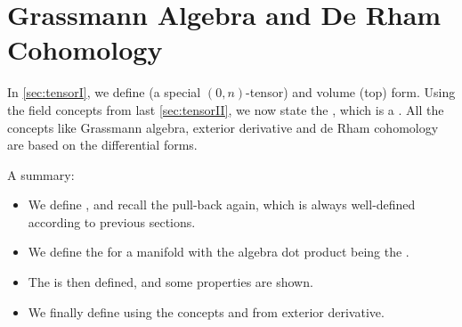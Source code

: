 \documentclass{article}
\begin{document}
\begin{enumerate}
\end{enumerate}

\section{Grassmann Algebra and De Rham Cohomology}\label{sec:grass}
In \cref{sec:tensorI}, we define  (a special $(0, n)$-tensor) and volume (top) form. Using the field concepts from last \cref{sec:tensorII}, we now state the , which is a  . All the concepts like Grassmann algebra, exterior derivative and de Rham cohomology are based on the differential forms.

A summary:
\begin{itemize}[$\blacktriangleright$]
\item We define , and recall the pull-back again, which is always well-defined according to previous sections.
\item We define the  for a manifold with the algebra dot product being the .
\item The  is then defined, and some properties are shown.
\item We finally define  using the concepts  and  from exterior derivative.
\end{itemize}
\end{document}
